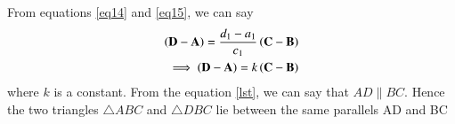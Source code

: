 \documentclass[journal,12pt,twocolumn]{IEEEtran}
\begin{document}
From equations \eqref{eq14} and \eqref{eq15}, we can say
\begin{align}
    \left(\mathbf{D}-\mathbf{A}\right)=\frac{d_1-a_1}{c_1}\left(\mathbf{C}-\mathbf{B}\right)\\
    \label{lst}
    \implies \left(\mathbf{D}-\mathbf{A}\right)=k\left(\mathbf{C}-\mathbf{B}\right)
\end{align}
where $k$ is a constant. From the equation \eqref{lst}, we can say that $AD \parallel BC$. Hence the two triangles $\triangle ABC$ and $\triangle DBC$ lie between the same parallels AD and BC
\end{document}
